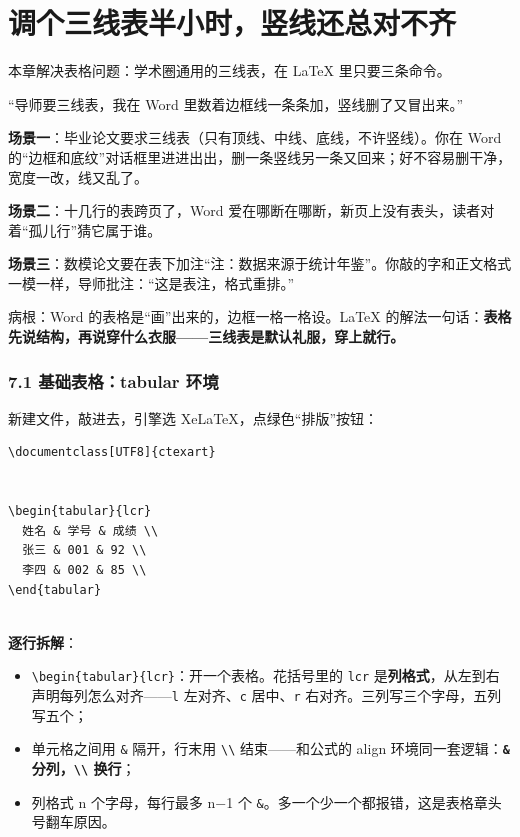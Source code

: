 \chapter{调个三线表半小时，竖线还总对不齐}

\begin{notebox}
本章解决表格问题：学术圈通用的三线表，在 LaTeX 里只要三条命令。
\end{notebox}


“导师要三线表，我在 Word 里数着边框线一条条加，竖线删了又冒出来。”


\textbf{场景一}：毕业论文要求三线表（只有顶线、中线、底线，不许竖线）。你在 Word 的“边框和底纹”对话框里进进出出，删一条竖线另一条又回来；好不容易删干净，宽度一改，线又乱了。

\textbf{场景二}：十几行的表跨页了，Word 爱在哪断在哪断，新页上没有表头，读者对着“孤儿行”猜它属于谁。

\textbf{场景三}：数模论文要在表下加注“注：数据来源于统计年鉴”。你敲的字和正文格式一模一样，导师批注：“这是表注，格式重排。”

病根：Word 的表格是“画”出来的，边框一格一格设。LaTeX 的解法一句话：\textbf{表格先说结构，再说穿什么衣服——三线表是默认礼服，穿上就行。}


\subsection*{7.1 基础表格：tabular 环境}

新建文件，敲进去，引擎选 XeLaTeX，点绿色“排版”按钮：

\begin{lstlisting}
\documentclass[UTF8]{ctexart}


\begin{tabular}{lcr}
  姓名 & 学号 & 成绩 \\
  张三 & 001 & 92 \\
  李四 & 002 & 85 \\
\end{tabular}


\end{lstlisting}

\textbf{逐行拆解}：

\begin{itemize}
\setlength{\itemsep}{2pt}
\item \texttt{\textbackslash{}begin\{tabular\}\{lcr\}}：开一个表格。花括号里的 \texttt{lcr} 是\textbf{列格式}，从左到右声明每列怎么对齐——\texttt{l} 左对齐、\texttt{c} 居中、\texttt{r} 右对齐。三列写三个字母，五列写五个；
\item 单元格之间用 \texttt{\&} 隔开，行末用 \texttt{\textbackslash{}\textbackslash{}} 结束——和公式的 align 环境同一套逻辑：\textbf{\texttt{\&} 分列，\texttt{\textbackslash{}\textbackslash{}} 换行}；
\item 列格式 n 个字母，每行最多 n−1 个 \texttt{\&}。多一个少一个都报错，这是表格章头号翻车原因。
\end{itemize}

